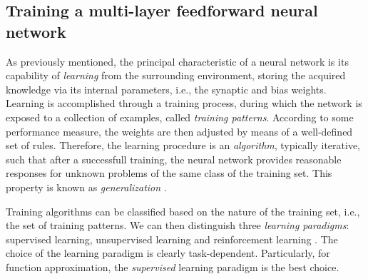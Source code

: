 \documentclass{elsarticle}
\numberwithin{equation}{section}
\theoremstyle{theorem}
\theoremstyle{definition}
\theoremstyle{remark}
\theoremstyle{proposition}
\numberwithin{figure}{section}
\begin{document}
		
	
	\subsection{Training a multi-layer feedforward neural network}
	\label{section:Training a multi-layer feedforward neural network}
	
		As previously mentioned, the principal characteristic of a neural network is its capability of \emph{learning} from the surrounding environment, storing the acquired knowledge via its internal parameters, i.e., the synaptic and bias weights. Learning is accomplished through a training process, during which the network is exposed to a collection of examples, called \emph{training patterns}. According to some performance measure, the weights are then adjusted by means of a well-defined set of rules. Therefore, the learning procedure is an \emph{algorithm}, typically iterative, such that after a successfull training, the neural network provides reasonable responses for unknown problems of the same class of the training set. This property is known as \emph{generalization} \cite{Kri07}. 
		
		Training algorithms can be classified based on the nature of the training set, i.e., the set of training patterns. We can then distinguish three \emph{learning paradigms}: supervised learning, unsupervised learning and reinforcement learning \cite{Hag14}. The choice of the learning paradigm is clearly task-dependent. Particularly, for function approximation, the \emph{supervised} learning paradigm is the best choice. 
		
\end{document}
